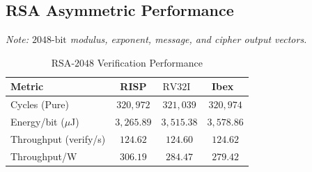 \subsection{RSA Asymmetric Performance}

\begin{table}[!t]
\centering
\caption{Functional Verification Vectors for $\text{RSA}\text{-}2048$ Engine}
\label{tab:rsa_functional_full}
\small
{}
\vspace{2pt}
\raggedright
\footnotesize\textit{Note: $2048\text{-}\text{bit}$ modulus, exponent, message, and cipher output vectors.}
\end{table}

\begin{table}[!t]
\centering
\caption{$\text{RSA}\text{-}2048$ Verification Performance}
\label{tab:rsa_perf}
\small
\begin{tabular}{l  c c c}
\toprule
\textbf{Metric} & \textbf{RISP} & \textbf{$\text{RV}32\text{I}$~\cite{harris2021digital}} & \textbf{Ibex~\cite{gallmann2021swift}} \\
\midrule
Cycles (Pure) & $320,972$ & $321,039$ & $320,974$ \\
Energy/bit ($\mu$J) & $3,265.89$ & $3,515.38$ & $3,578.86$ \\
Throughput (verify/s) & $124.62$ & $124.60$ & $124.62$ \\
Throughput/W & $306.19$ & $284.47$ & $279.42$ \\
\bottomrule
\end{tabular}
\end{table}

